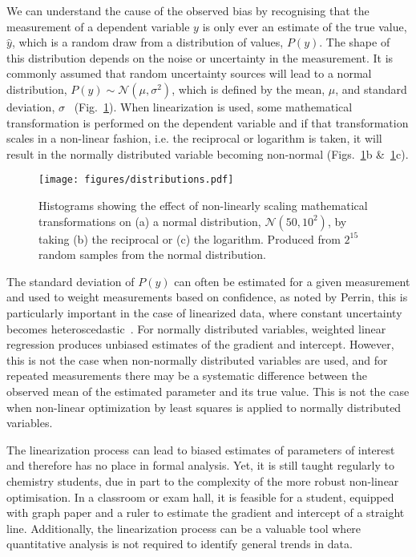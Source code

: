 \documentclass[reprint,superscriptaddress,nobibnotes,amsmath,amssymb]{revtex4-2}
\begin{document}
We can understand the cause of the observed bias by recognising that the measurement of a dependent variable $y$ is only ever an estimate of the true value, $\hat{y}$, which is a random draw from a distribution of values, $P(y)$. 
The shape of this distribution depends on the noise or uncertainty in the measurement. 
It is commonly assumed that random uncertainty sources will lead to a normal distribution, $P(y) \sim \mathcal{N}(\mu, \sigma^2)$, which is defined by the mean, $\mu$, and standard deviation, $\sigma$~\cite{monk_math_2010} (Fig.~\ref{fig:distributions}).
When linearization is used, some mathematical transformation is performed on the dependent variable and if that transformation scales in a non-linear fashion, i.e. the reciprocal or logarithm is taken, it will result in the normally distributed variable becoming non-normal (Figs.~\ref{fig:distributions}b \&~\ref{fig:distributions}c).
%
\begin{figure}
  \texttt{[image: figures/distributions.pdf]}
  \caption{
    Histograms showing the effect of non-linearly scaling mathematical transformations on (a) a normal distribution, $\mathcal{N}(50, 10^2)$, by taking (b) the reciprocal or (c) the logarithm. 
    Produced from $2^{15}$ random samples from the normal distribution.
    }
  \label{fig:distributions}
\end{figure}
%

The standard deviation of $P(y)$ can often be estimated for a given measurement and used to weight measurements based on confidence, as noted by Perrin, this is particularly important in the case of linearized data, where constant uncertainty becomes heteroscedastic~\cite{perrin_linear_2017}.
For normally distributed variables, weighted linear regression produces unbiased estimates of the gradient and intercept. 
However, this is not the case when non-normally distributed variables are used, and for repeated measurements there may be a systematic difference between the observed mean of the estimated parameter and its true value.
This is not the case when non-linear optimization by least squares is applied to normally distributed variables. 

The linearization process can lead to biased estimates of parameters of interest and therefore has no place in formal analysis. 
Yet, it is still taught regularly to chemistry students, due in part to the complexity of the more robust non-linear optimisation. 
In a classroom or exam hall, it is feasible for a student, equipped with graph paper and a ruler to estimate the gradient and intercept of a straight line. 
Additionally, the linearization process can be a valuable tool where quantitative analysis is not required to identify general trends in data. 
\end{document}
